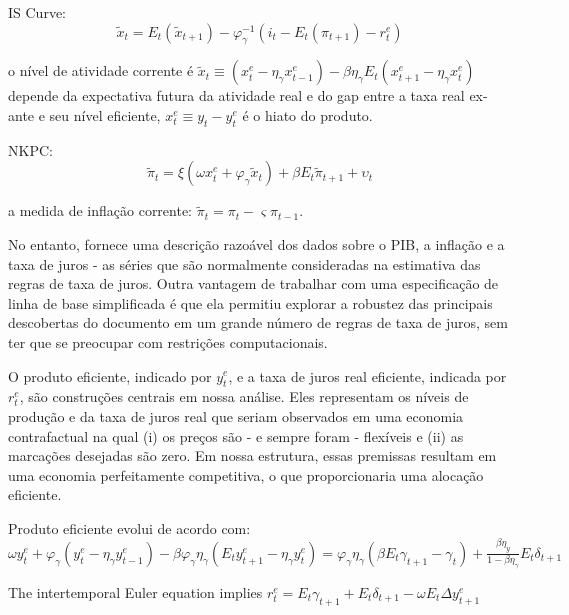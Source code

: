 IS Curve:
\begin{equation}
    \tilde{x}_t = E_t(\tilde{x}_{t+1}) - \varphi_{\gamma}^{-1}(i_t - E_t(\pi_{t+1}) - r_t^{e} )
\end{equation}

o nível de atividade corrente é $\tilde{x}_t \equiv (x_t^{e} - \eta_{\gamma}x_{t-1}^{e} ) - \beta \eta_{\gamma} E_t(x_{t+1}^{e} - \eta_{\gamma} x_t^{e} ) $ depende da expectativa futura da atividade real e do gap entre a taxa real ex-ante e seu nível eficiente, $x_t^{e} \equiv y_t - y_t^{e} $ é o hiato do produto.

NKPC:
\begin{equation}
    \tilde{\pi}_t = \xi(\omega x_t^{e} + \varphi_{\gamma}\tilde{x}_t ) + \beta E_t \tilde{\pi}_{t+1} + \upsilon_t
\end{equation}

a medida de inflação corrente: $\tilde{\pi}_t = \pi_t - \varsigma \pi_{t-1} $.

No entanto, fornece uma descrição razoável dos dados sobre o PIB, a inflação e a taxa de juros - as séries que são normalmente consideradas na estimativa das regras de taxa de juros. Outra vantagem de trabalhar com uma especificação de linha de base simplificada é que ela permitiu explorar a robustez das principais descobertas do documento em um grande número de regras de taxa de juros, sem ter que se preocupar com restrições computacionais.

O produto eficiente, indicado por $y_{t}^{e}$, e a taxa de juros real eficiente, indicada por $r_{t}^{e}$, são construções centrais em nossa análise. Eles representam os níveis de produção e da taxa de juros real que seriam observados em uma economia contrafactual na qual (i) os preços são - e sempre foram - flexíveis e (ii) as marcações desejadas são zero. Em nossa estrutura, essas premissas resultam em uma economia perfeitamente competitiva, o que proporcionaria uma alocação eficiente.

Produto eficiente evolui de acordo com:
$\omega y_{t}^{e}+\varphi_{\gamma}\left(y_{t}^{e}-\eta_{\gamma} y_{t-1}^{e}\right)-\beta \varphi_{\gamma} \eta_{\gamma}\left(E_{t} y_{t+1}^{e}-\eta_{\gamma} y_{t}^{e}\right)=\varphi_{\gamma} \eta_{\gamma}\left(\beta E_{t} \gamma_{t+1}-\gamma_{t}\right)+\frac{\beta \eta_y}{1-\beta \eta_{\gamma}} E_{t} \delta_{t+1}$

The intertemporal Euler equation implies
$r_{t}^{e}=E_{t} \gamma_{t+1}+E_{t} \delta_{t+1}-\omega E_{t} \Delta y_{t+1}^{e}$

